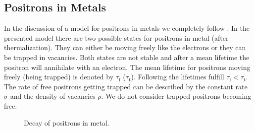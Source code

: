 \subsection{Positrons in Metals}
In the discussion of a model for positrons in metals we completely follow \cite{material_tutor}. In the presented model there are two possible states for positrons in metal (after thermalization). They can either be moving freely like the electrons or they can be trapped in vacancies. Both states are not stable and after a mean lifetime the positron will annihilate with an electron. The mean lifetime for positrons moving freely (being trapped) is denoted by $\tau_\mathrm{f}$ ($\tau_\mathrm{t}$). Following \cite{material_tutor} the lifetimes fulfill $\tau_\mathrm{f}< \tau_\mathrm{t}$. The rate of free positrons getting trapped can be described by the constant rate $\sigma$ and the density of vacancies $\rho$.  We do not consider trapped positrons becoming free. 

\begin{figure}[h]
  \centering
  \caption{Decay of positrons in metal.}
  \label{fig:model}
\end{figure}

